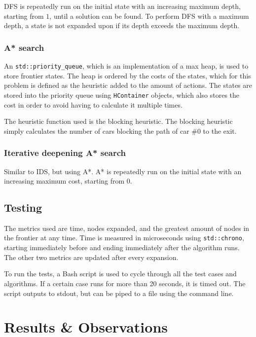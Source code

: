 \documentclass[12pt, a4paper]{article}
\begin{document}
DFS is repeatedly run on the initial state with an increasing maximum depth, starting from $1$, until a solution can be found. To perform DFS with a maximum depth, a state is not expanded upon if its depth exceeds the maximum depth.

\subsubsection{A* search}

An {\tt std::priority\_queue}, which is an implementation of a max heap, is used to store frontier states. The heap is ordered by the costs of the states, which for this problem is defined as the heuristic added to the amount of actions. The states are stored into the priority queue using {\tt HContainer} objects, which also stores the cost in order to avoid having to calculate it multiple times. 

The heuristic function used is the blocking heuristic. The blocking heuristic simply calculates the number of cars blocking the path of car \#0 to the exit. 

\subsubsection{Iterative deepening A* search}

Similar to IDS, but using A*. A* is repeatedly run on the initial state with an increasing maximum cost, starting from 0.

\subsection{Testing}

The metrics used are time, nodes expanded, and the greatest amount of nodes in the frontier at any time. Time is measured in microseconds using {\tt std::chrono}, starting immediately before and ending immediately after the algorithm runs. The other two metrics are updated after every expansion.

To run the tests, a Bash script is used to cycle through all the test cases and algorithms. If a certain case runs for more than 20 seconds, it is timed out. The script outputs to stdout, but can be piped to a file using the command line.

\section{Results \& Observations}
\end{document}
